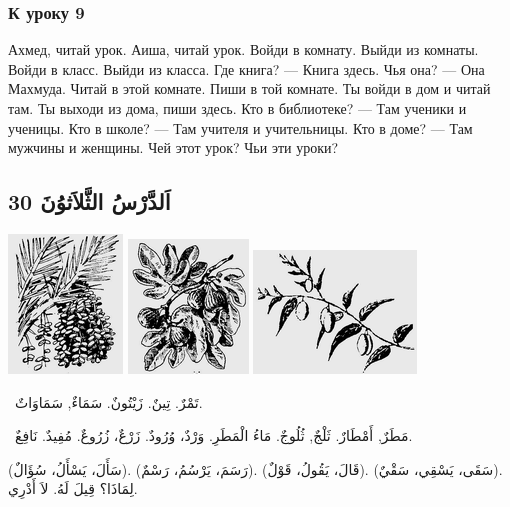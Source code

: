 \documentclass[a5paper]{article}
\begin{document}
\subsubsection{К уроку 9}
Ахмед, читай урок. Аиша, читай урок. Войди в комнату. Выйди из комнаты. Войди в класс. Выйди из класса. Где книга? — Книга здесь. Чья она? — Она Махмуда. Читай в этой комнате. Пиши в той комнате. Ты войди в дом и читай там. Ты выходи из дома, пиши здесь. Кто в библиотеке? — Там ученики и ученицы. Кто в школе? — Там учителя и учительницы. Кто в доме? — Там мужчины и женщины. Чей этот урок? Чьи эти уроки?

\subsection{30 اَلدَّرْسُ الثَّلاَثوُنَ}
 \includegraphics[width=1.198in,height=1.4583in]{MuhammadBagauddinlatinized-img060.png}  \includegraphics[width=1.2602in,height=1.4063in]{MuhammadBagauddinlatinized-img061.png}   \includegraphics[width=1.7083in,height=1.2917in]{MuhammadBagauddinlatinized-img062.png} 

\ تَمْرٌ. تِينٌ. زَيْتُونٌ. سَمَاءٌ, سَمَاوَاتٌ.

\ مَطَرٌ, أَمْطَارٌ. ثَلْجٌ, ثُلُوجٌ. مَاءُ الْمَطَرِ. وَرْدٌ، وُرُودٌ. زَرْعٌ، زُرُوعٌ. مُفِيدٌ. نَافِعٌ.

(سَأَلَ، يَسْأَلُ، سُؤَالٌ). (رَسَمَ، يَرْسُمُ، رَسْمٌ). (قَالَ، يَقُولُ، قَوْلٌ). (سَقَى، يَسْقِي، سَقْيٌ). لِمَاذَا؟ قِيلَ لَهُ. لاَ أَدْرِي.
\end{document}
